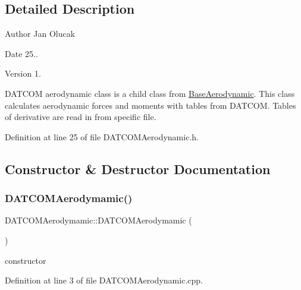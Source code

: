\subsection{Detailed Description}
\begin{DoxyAuthor}{Author}
Jan Olucak 
\end{DoxyAuthor}
\begin{DoxyDate}{Date}
25.. 
\end{DoxyDate}
\begin{DoxyVersion}{Version}
1.
\end{DoxyVersion}
D\+A\+T\+C\+OM aerodynamic class is a child class from \hyperlink{class_base_aerodynamic}{Base\+Aerodynamic}. This class calculates aerodynamic forces and moments with tables from D\+A\+T\+C\+OM. Tables of derivative are read in from specific file. 

Definition at line 25 of file D\+A\+T\+C\+O\+M\+Aerodynamic.\+h.



\subsection{Constructor \& Destructor Documentation}
\mbox{\label{class_d_a_t_c_o_m_aerodymamic_a03d01a72cf389483e03e2bf6cce33299}} 
\subsubsection{\texorpdfstring{D\+A\+T\+C\+O\+M\+Aerodymamic()}{DATCOMAerodymamic()}}
{\footnotesize\ttfamily D\+A\+T\+C\+O\+M\+Aerodymamic\+::\+D\+A\+T\+C\+O\+M\+Aerodymamic (\begin{DoxyParamCaption}{ }\end{DoxyParamCaption})}



constructor 



Definition at line 3 of file D\+A\+T\+C\+O\+M\+Aerodynamic.\+cpp.

\mbox{\label{class_d_a_t_c_o_m_aerodymamic_a3619e38867cad4b0c8b06a939281a74e}} 
